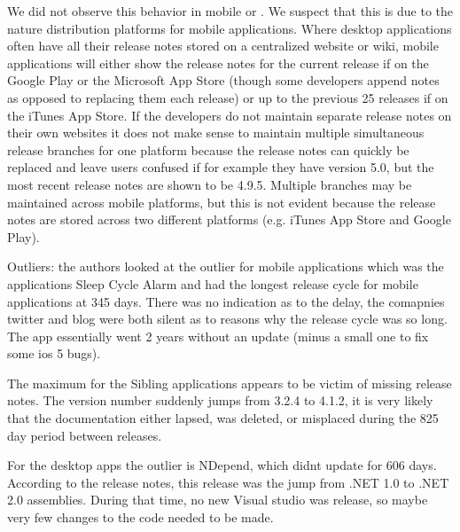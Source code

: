 \documentclass{acm_proc_article-sp}
\begin{document}
We did not observe this behavior in mobile or \sibs. We suspect that this is due to the nature distribution platforms for mobile applications.
Where desktop applications often have all their release notes stored on a centralized website or wiki, mobile applications will either show the release notes for the current release if on the Google Play or the Microsoft App Store (though some developers append notes as opposed to replacing them each release) or up to the previous 25 releases if on the iTunes App Store. 
If the developers do not maintain separate release notes on their own websites it does not make sense to maintain multiple simultaneous release branches for one platform because the release notes can quickly be replaced and leave users confused if for example they have version 5.0, but the most recent release notes are shown to be 4.9.5.
Multiple branches may be maintained across mobile platforms, but this is not evident because the release notes are stored across two different platforms (e.g. iTunes App Store and Google Play).

\begin{center}

\label{tab:sumcycles}
\end{center}

\begin{center}

\label{tab:cycles}
\end{center}



Outliers: the authors looked at the outlier for mobile applications which was the applications Sleep Cycle Alarm and had the longest release cycle  for mobile applications at 345 days. There was no indication as to the delay, the comapnies twitter and blog were both silent as to reasons why the release cycle was so long.
The app essentially went 2 years without an update (minus a small one to fix some ios 5 bugs).

The maximum for the Sibling applications appears to be victim of missing release notes. 
The version number suddenly jumps from 3.2.4 to 4.1.2, it is very likely that the documentation either lapsed, was deleted, or misplaced during the 825 day period between releases.

For the desktop apps the outlier is NDepend, which didnt update for 606 days. 
According to the release notes, this release was the jump from .NET 1.0 to .NET 2.0 assemblies.
During that time, no new Visual studio was release, so maybe very few changes to the code needed to be made.
\end{document}
